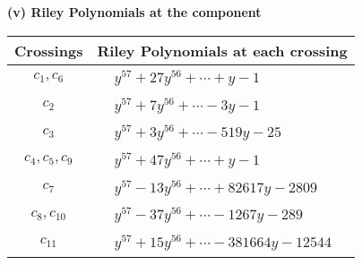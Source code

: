 \documentclass[1p]{elsarticle_modified}
\theoremstyle{definition}
\begin{document}
\newpage\renewcommand{\arraystretch}{1}
\flushleft \textbf{(v) Riley Polynomials at the component}\newline \\
\begin{tabular}{m{50pt}|m{274pt}}
Crossings & \hspace{64pt}Riley Polynomials at each crossing \\
\hline $$\begin{aligned}c_{1},c_{6}\end{aligned}$$&$\begin{aligned}
&y^{57}+27 y^{56}+\cdots+y-1
\end{aligned}$\\
\hline $$\begin{aligned}c_{2}\end{aligned}$$&$\begin{aligned}
&y^{57}+7 y^{56}+\cdots-3 y-1
\end{aligned}$\\
\hline $$\begin{aligned}c_{3}\end{aligned}$$&$\begin{aligned}
&y^{57}+3 y^{56}+\cdots-519 y-25
\end{aligned}$\\
\hline $$\begin{aligned}c_{4},c_{5},c_{9}\end{aligned}$$&$\begin{aligned}
&y^{57}+47 y^{56}+\cdots+y-1
\end{aligned}$\\
\hline $$\begin{aligned}c_{7}\end{aligned}$$&$\begin{aligned}
&y^{57}-13 y^{56}+\cdots+82617 y-2809
\end{aligned}$\\
\hline $$\begin{aligned}c_{8},c_{10}\end{aligned}$$&$\begin{aligned}
&y^{57}-37 y^{56}+\cdots-1267 y-289
\end{aligned}$\\
\hline $$\begin{aligned}c_{11}\end{aligned}$$&$\begin{aligned}
&y^{57}+15 y^{56}+\cdots-381664 y-12544
\end{aligned}$\\
\hline
\end{tabular}\\~\\
\end{document}
